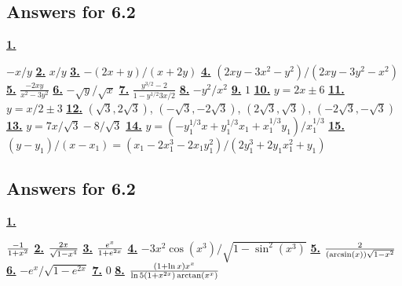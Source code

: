 \subsection *{Answers for 6.2}
\hypertarget {a:6.2.1}{\hyperlink {e:6.2.1}{\bfseries 1.}} \mdseries $-x/y$\qquad 
\hypertarget {a:6.2.2}{\hyperlink {e:6.2.2}{\bfseries 2.}} \mdseries $x/y$\qquad 
\hypertarget {a:6.2.3}{\hyperlink {e:6.2.3}{\bfseries 3.}} \mdseries $-(2x+y)/(x+2y)$\qquad 
\hypertarget {a:6.2.4}{\hyperlink {e:6.2.4}{\bfseries 4.}} \mdseries $(2xy-3x^2-y^2)/(2xy-3y^2-x^2)$\qquad 
\hypertarget {a:6.2.5}{\hyperlink {e:6.2.5}{\bfseries 5.}} \mdseries $\frac {-2xy}{x^2-3y^2}$\qquad 
\hypertarget {a:6.2.6}{\hyperlink {e:6.2.6}{\bfseries 6.}} \mdseries $-\sqrt {y}/\sqrt {x}$\qquad 
\hypertarget {a:6.2.7}{\hyperlink {e:6.2.7}{\bfseries 7.}} \mdseries $\frac {y^{3/2}-2}{1-y^{1/2}3x/2}$\qquad 
\hypertarget {a:6.2.8}{\hyperlink {e:6.2.8}{\bfseries 8.}} \mdseries $-y^2/x^2$\qquad 
\hypertarget {a:6.2.9}{\hyperlink {e:6.2.9}{\bfseries 9.}} \mdseries $1$\qquad 
\hypertarget {a:6.2.10}{\hyperlink {e:6.2.10}{\bfseries 10.}} \mdseries $y=2x\pm 6$\qquad 
\hypertarget {a:6.2.11}{\hyperlink {e:6.2.11}{\bfseries 11.}} \mdseries $y=x/2\pm 3$\qquad 
\hypertarget {a:6.2.12}{\hyperlink {e:6.2.12}{\bfseries 12.}} \mdseries $(\sqrt 3,2\sqrt 3)$, $(-\sqrt 3,-2\sqrt 3)$, $(2\sqrt 3,\sqrt 3)$, $(-2\sqrt 3,-\sqrt 3)$\qquad 
\hypertarget {a:6.2.13}{\hyperlink {e:6.2.13}{\bfseries 13.}} \mdseries $y=7x/\sqrt 3-8/\sqrt 3$\qquad 
\hypertarget {a:6.2.14}{\hyperlink {e:6.2.14}{\bfseries 14.}} \mdseries $y=(-y_1^{1/3}x+y_1^{1/3}x_1+x_1^{1/3}y_1)/x_1^{1/3}$\qquad 
\hypertarget {a:6.2.15}{\hyperlink {e:6.2.15}{\bfseries 15.}} \mdseries $(y-y_1)/(x-x_1)=(x_1-2x_1^3-2x_1y_1^2)/(2y_1^3+2y_1x_1^2+y_1)$\qquad 
\subsection *{Answers for 6.2}
\hypertarget {a:6.2.1}{\hyperlink {e:6.2.1}{\bfseries 1.}} \mdseries ${-1\over 1+x^2}$\qquad 
\hypertarget {a:6.2.2}{\hyperlink {e:6.2.2}{\bfseries 2.}} \mdseries ${2x\over \sqrt {1-x^4}}$\qquad 
\hypertarget {a:6.2.3}{\hyperlink {e:6.2.3}{\bfseries 3.}} \mdseries ${e^x\over 1+e^{2x}}$\qquad 
\hypertarget {a:6.2.4}{\hyperlink {e:6.2.4}{\bfseries 4.}} \mdseries $-3x^2\cos (x^3)/\sqrt {1-\sin ^2(x^3)}$\qquad 
\hypertarget {a:6.2.5}{\hyperlink {e:6.2.5}{\bfseries 5.}} \mdseries ${2\over (\arcsin (x))\sqrt {1-x^2}}$\qquad 
\hypertarget {a:6.2.6}{\hyperlink {e:6.2.6}{\bfseries 6.}} \mdseries $-e^x/\sqrt {1-e^{2x}}$\qquad 
\hypertarget {a:6.2.7}{\hyperlink {e:6.2.7}{\bfseries 7.}} \mdseries $0$\qquad 
\hypertarget {a:6.2.8}{\hyperlink {e:6.2.8}{\bfseries 8.}} \mdseries ${(1+\ln x)x^x\over \ln 5(1+x^{2x})\arctan (x^x)}$\qquad 

